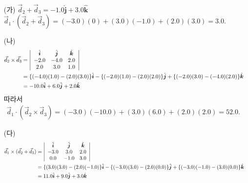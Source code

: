\documentclass[floatfix,nofootinbib,superscriptaddress,fleqn]{revtex4-2}
\begin{document}
 \\
\begin{itemize}
  \item[(가)] $\vec{d}_2+\vec{d}_3=-1.0\hat{\boldsymbol{j}}+3.0\hat{\boldsymbol{k}}$\\
   $\vec{d}_1\cdot(\vec{d}_2+\vec{d}_3)=(-3.0)(0)+(3.0)(-1.0)+(2.0)(3.0)=3.0$.
  \item[(나)] \begin{align}
     \vec{d}_2\times \vec{d}_3&=\left|\begin{array}{ccc}
      \hat{\boldsymbol{i}}&\hat{\boldsymbol{j}}&\hat{\boldsymbol{k}}\\
      -2.0 & -4.0 & 2.0\\
      2.0 & 3.0 & 1.0
     \end{array}\right|\cr
     &=\{(-4.0)(1.0)-(2.0)(3.0)\}\hat{\boldsymbol{i}}-\{(-2.0)(1.0)-(2.0)(2.0)\}\hat{\boldsymbol{j}}+\{(-2.0)(3.0)-(-4.0)(2.0)\}\hat{\boldsymbol{k}}\cr
     &=-10.0\hat{\boldsymbol{i}}+6.0\hat{\boldsymbol{j}}+2.0\hat{\boldsymbol{k}}
   \end{align}
   따라서 
   \begin{align}
     \vec{d}_1\cdot(\vec{d}_2\times\vec{d}_3)=(-3.0)(-10.0)+(3.0)(6.0)+(2.0)(2.0)=52.0.
   \end{align}

  \item[(다)] \begin{align}
     \vec{d}_1\times(\vec{d}_2+\vec{d}_3)&=\left|\begin{array}{ccc}
      \hat{\boldsymbol{i}}&\hat{\boldsymbol{j}}&\hat{\boldsymbol{k}}\\
      -3.0&3.0&2.0\\
      0.0&-1.0&3.0
     \end{array}\right|\cr
     &=\{(3.0)(3.0)-(2.0)(-1.0)\}\hat{\boldsymbol{i}}-\{(-3.0)(3.0)-(2.0)(0.0)\}\hat{\boldsymbol{j}}+\{(-3.0)(-1.0)-(3.0)(0.0)\}\hat{\boldsymbol{k}}\cr
     &=11.0\hat{\boldsymbol{i}}+9.0\hat{\boldsymbol{j}}+3.0\hat{\boldsymbol{k}}
   \end{align}
\end{itemize}
\noindent 
\end{document}
